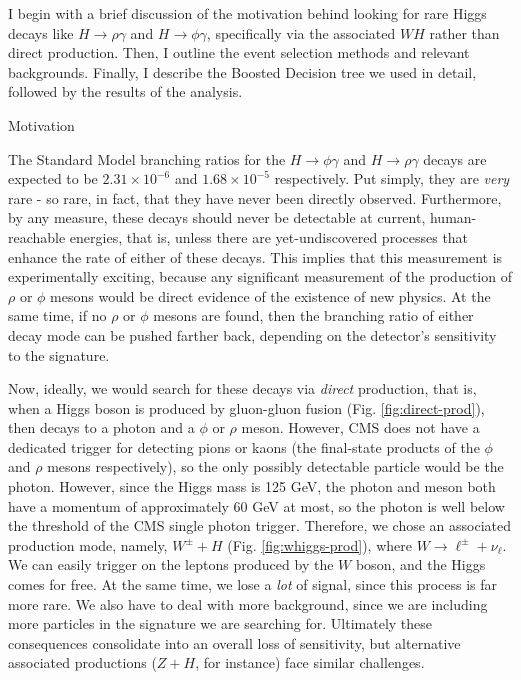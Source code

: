 %
%

I begin with a brief discussion of the motivation behind looking for rare Higgs decays like $H \rightarrow \rho\gamma$ and $H \rightarrow \phi\gamma$, specifically via the associated $WH$ rather than direct production. Then, I outline the event selection methods and relevant backgrounds. Finally, I describe the Boosted Decision tree we used in detail, followed by the results of the analysis.

\begin{section}{Motivation}\label{motivation}

The Standard Model branching ratios for the $H\rightarrow\phi\gamma$ and $H\rightarrow\rho\gamma$ decays are expected to be $2.31\times10^{-6}$ and $1.68\times10^{-5}$  respectively\cite{cite-sm-brs}. Put simply, they are \textit{very} rare - so rare, in fact, that they have never been directly observed. Furthermore, by any measure, these decays should never be detectable at current, human-reachable energies, that is, unless there are yet-undiscovered processes that enhance the rate of either of these decays. This implies that this measurement is experimentally exciting, because any significant measurement of the production of $\rho$ or $\phi$ mesons would be direct evidence of the existence of new physics. At the same time, if no $\rho$ or $\phi$ mesons are found, then the branching ratio of either decay mode can be pushed farther back, depending on the detector's sensitivity to the signature.

Now, ideally, we would search for these decays via \textit{direct} production, that is, when a Higgs boson is produced by gluon-gluon fusion (Fig. \ref{fig:direct-prod}), then decays to a photon and a $\phi$ or $\rho$ meson. However, CMS does not have a dedicated trigger for detecting pions or kaons (the final-state products of the $\phi$ and $\rho$ mesons respectively), so the only possibly detectable particle would be the photon. However, since the Higgs mass is 125 GeV, the photon and meson both have a momentum of approximately 60 GeV at most, so the photon is well below the threshold of the CMS single photon trigger\cite{cite-hlt}. Therefore, we chose an associated production mode, namely, $W^{\pm}+H$ (Fig. \ref{fig:whiggs-prod}), where $W \rightarrow \ell^{\pm}+\nu_{\ell}$. We can easily trigger on the leptons produced by the $W$ boson, and the Higgs comes for free. At the same time, we lose a \textit{lot} of signal, since this process is far more rare. We also have to deal with more background, since we are including more particles in the signature we are searching for. Ultimately these consequences consolidate into an overall loss of sensitivity, but alternative associated productions ($Z+H$, for instance) face similar challenges.


\end{section}
